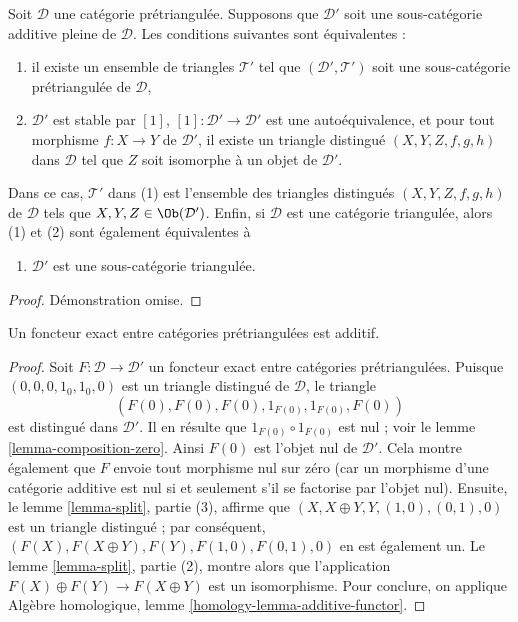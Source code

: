 \begin{lemma}
\label{lemma-triangulated-subcategory}
Soit $\mathcal{D}$ une catégorie prétriangulée.
Supposons que $\mathcal{D}'$ soit une sous-catégorie additive pleine de
$\mathcal{D}$. Les conditions suivantes sont équivalentes :
\begin{enumerate}
\item il existe un ensemble de triangles $\mathcal{T}'$ tel que
$(\mathcal{D}', \mathcal{T}')$ soit une sous-catégorie prétriangulée de
$\mathcal{D}$,
\item $\mathcal{D}'$ est stable par $[1]$,
$[1] : \mathcal{D}' \to \mathcal{D}'$ est une autoéquivalence, et pour tout
morphisme $f : X \to Y$ de $\mathcal{D}'$, il existe un triangle distingué
$(X, Y, Z, f, g, h)$ dans $\mathcal{D}$ tel que $Z$ soit isomorphe à un objet
de $\mathcal{D}'$.
\end{enumerate}
Dans ce cas, $\mathcal{T}'$ dans (1) est l'ensemble des triangles distingués
$(X, Y, Z, f, g, h)$ de $\mathcal{D}$ tels que
$X, Y, Z \in \Ob(\mathcal{D}')$. Enfin, si $\mathcal{D}$ est une catégorie
triangulée, alors (1) et (2) sont également équivalentes à
\begin{enumerate}
\item[(3)] $\mathcal{D}'$ est une sous-catégorie triangulée.
\end{enumerate}
\end{lemma}

\begin{proof}
Démonstration omise.
\end{proof}

\begin{lemma}
\label{lemma-exact-functor-additive}
Un foncteur exact entre catégories prétriangulées est additif.
\end{lemma}

\begin{proof}
Soit $F : \mathcal{D} \to \mathcal{D}'$ un foncteur exact entre catégories
prétriangulées. Puisque $(0, 0, 0, 1_0, 1_0, 0)$ est un triangle distingué de
$\mathcal{D}$, le triangle
$$
(F(0), F(0), F(0), 1_{F(0)}, 1_{F(0)}, F(0))
$$
est distingué dans $\mathcal{D}'$.
Il en résulte que $1_{F(0)} \circ 1_{F(0)}$ est nul ; voir le
lemme \ref{lemma-composition-zero}.
Ainsi $F(0)$ est l'objet nul de $\mathcal{D}'$. Cela montre également que
$F$ envoie tout morphisme nul sur zéro (car un morphisme d'une catégorie
additive est nul si et seulement s'il se factorise par l'objet nul).
Ensuite, le lemme \ref{lemma-split}, partie (3), affirme que
$(X, X \oplus Y, Y, (1, 0), (0, 1), 0)$ est un triangle distingué ; par
conséquent,
$(F(X), F(X \oplus Y), F(Y), F(1, 0), F(0, 1), 0)$ en est également un.
Le lemme \ref{lemma-split}, partie (2), montre alors que l'application
$F(X) \oplus F(Y) \to F(X \oplus Y)$ est un isomorphisme. Pour conclure,
on applique Algèbre homologique, lemme \ref{homology-lemma-additive-functor}.
\end{proof}

